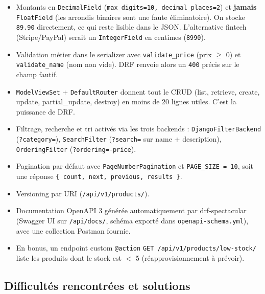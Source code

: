 \documentclass[11pt,a4paper]{article}
\begin{document}
\begin{itemize}
  \item Montants en \texttt{DecimalField} (\texttt{max\_digits=10, decimal\_places=2}) et \textbf{jamais} \texttt{FloatField} (les arrondis binaires sont une faute éliminatoire). On stocke \texttt{89.90} directement, ce qui reste lisible dans le JSON. L'alternative fintech (Stripe/PayPal) serait un \texttt{IntegerField} en centimes (\texttt{8990}).
  \item Validation métier dans le serializer avec \texttt{validate\_price} (prix $\geq$ 0) et \texttt{validate\_name} (nom non vide). DRF renvoie alors un \texttt{400} précis sur le champ fautif.
  \item \texttt{ModelViewSet} + \texttt{DefaultRouter} donnent tout le CRUD (list, retrieve, create, update, partial\_update, destroy) en moins de 20 lignes utiles. C'est la puissance de DRF.
  \item Filtrage, recherche et tri activés via les trois backends : \texttt{DjangoFilterBackend} (\texttt{?category=}), \texttt{SearchFilter} (\texttt{?search=} sur name + description), \texttt{OrderingFilter} (\texttt{?ordering=-price}).
  \item Pagination par défaut avec \texttt{PageNumberPagination} et \texttt{PAGE\_SIZE = 10}, soit une réponse \texttt{\{ count, next, previous, results \}}.
  \item Versioning par URI (\texttt{/api/v1/products/}).
  \item Documentation OpenAPI 3 générée automatiquement par drf-spectacular (Swagger UI sur \texttt{/api/docs/}, schéma exporté dans \texttt{openapi-schema.yml}), avec une collection Postman fournie.
  \item En bonus, un endpoint custom \texttt{@action} \texttt{GET /api/v1/products/low-stock/} liste les produits dont le stock est $<$ 5 (réapprovisionnement à prévoir).
\end{itemize}

\subsection{Difficultés rencontrées et solutions}
\end{document}
